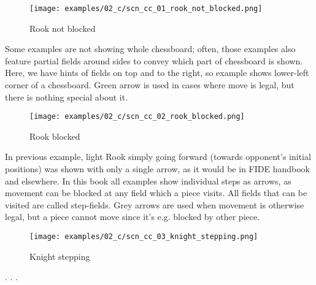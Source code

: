 \vspace*{-0.7\baselineskip}
\noindent
\begin{wrapfigure}[12]{l}{0.4\textwidth}
\centering
\texttt{[image: examples/02\_c/scn\_cc\_01\_rook\_not\_blocked.png]}
\vspace*{-1.4\baselineskip}
\caption{Rook not blocked}
\label{fig:scn_cc_01_rook_not_blocked}
\end{wrapfigure}
Some examples are not showing whole chessboard; often, those examples also
feature partial fields around sides to convey which part of chessboard is
shown. \newline
\indent
Here, we have hints of fields on top and to the right, so example shows
lower-left corner of a chessboard. \newline
\indent
Green arrow is used in cases where move is legal, but there is nothing special
about it.

\vspace*{2.7\baselineskip}
\noindent
\begin{wrapfigure}[14]{l}{0.4\textwidth}
\centering
\texttt{[image: examples/02\_c/scn\_cc\_02\_rook\_blocked.png]}
\vspace*{-1.4\baselineskip}
\caption{Rook blocked}
\label{fig:scn_cc_02_rook_blocked}
\end{wrapfigure}
In previous example, light Rook simply going forward (towards opponent's initial
positions) was shown with only a single arrow, as it would be in FIDE handbook and
elsewhere. \newline
\indent
In this book all examples show individual steps as arrows, as movement can be
blocked at any field which a piece visits. All fields that can be visited are
called step-fields. \newline
\indent
Grey arrows are used when movement is otherwise legal, but a piece cannot move
since it's e.g. blocked by other piece.

\clearpage %

\vspace*{-1.4\baselineskip}
\noindent
\begin{wrapfigure}[1]{l}{0.4\textwidth}
\centering
\texttt{[image: examples/02\_c/scn\_cc\_03\_knight\_stepping.png]}
\vspace*{-1.4\baselineskip}
\caption{Knight stepping}
\label{fig:scn_cc_03_knight_stepping}
\end{wrapfigure}
. . .

